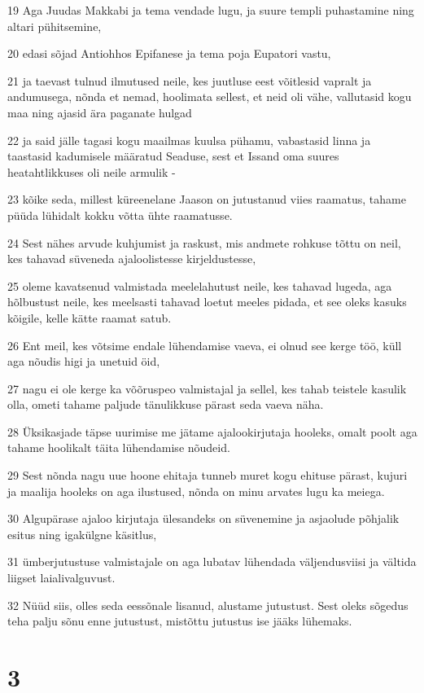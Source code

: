 \par 19 Aga Juudas Makkabi ja tema vendade lugu, ja suure templi puhastamine ning altari pühitsemine,
\par 20 edasi sõjad Antiohhos Epifanese ja tema poja Eupatori vastu,
\par 21 ja taevast tulnud ilmutused neile, kes juutluse eest võitlesid vapralt ja andumusega, nõnda et nemad, hoolimata sellest, et neid oli vähe, vallutasid kogu maa ning ajasid ära paganate hulgad
\par 22 ja said jälle tagasi kogu maailmas kuulsa pühamu, vabastasid linna ja taastasid kadumisele määratud Seaduse, sest et Issand oma suures heatahtlikkuses oli neile armulik -
\par 23 kõike seda, millest küreenelane Jaason on jutustanud viies raamatus, tahame püüda lühidalt kokku võtta ühte raamatusse.
\par 24 Sest nähes arvude kuhjumist ja raskust, mis andmete rohkuse tõttu on neil, kes tahavad süveneda ajaloolistesse kirjeldustesse,
\par 25 oleme kavatsenud valmistada meelelahutust neile, kes tahavad lugeda, aga hõlbustust neile, kes meelsasti tahavad loetut meeles pidada, et see oleks kasuks kõigile, kelle kätte raamat satub.
\par 26 Ent meil, kes võtsime endale lühendamise vaeva, ei olnud see kerge töö, küll aga nõudis higi ja unetuid öid,
\par 27 nagu ei ole kerge ka võõruspeo valmistajal ja sellel, kes tahab teistele kasulik olla, ometi tahame paljude tänulikkuse pärast seda vaeva näha.
\par 28 Üksikasjade täpse uurimise me jätame ajalookirjutaja hooleks, omalt poolt aga tahame hoolikalt täita lühendamise nõudeid.
\par 29 Sest nõnda nagu uue hoone ehitaja tunneb muret kogu ehituse pärast, kujuri ja maalija hooleks on aga ilustused, nõnda on minu arvates lugu ka meiega.
\par 30 Algupärase ajaloo kirjutaja ülesandeks on süvenemine ja asjaolude põhjalik esitus ning igakülgne käsitlus,
\par 31 ümberjutustuse valmistajale on aga lubatav lühendada väljendusviisi ja vältida liigset laialivalguvust.
\par 32 Nüüd siis, olles seda eessõnale lisanud, alustame jutustust. Sest oleks sõgedus teha palju sõnu enne jutustust, mistõttu jutustus ise jääks lühemaks.



\chapter{3}


